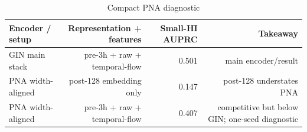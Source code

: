\begin{table}[t]
\centering
\caption{Compact PNA diagnostic}
\begin{tabular}{lrrr}
\toprule
Encoder / setup & Representation + features & Small-HI AUPRC & Takeaway \\
\midrule
GIN main stack & pre-3h + raw + temporal-flow & 0.501 & main encoder/result \\
PNA width-aligned & post-128 embedding only & 0.147 & post-128 understates PNA \\
PNA width-aligned & pre-3h + raw + temporal-flow & 0.407 & competitive but below GIN; one-seed diagnostic \\
\bottomrule
\end{tabular}
\end{table}
